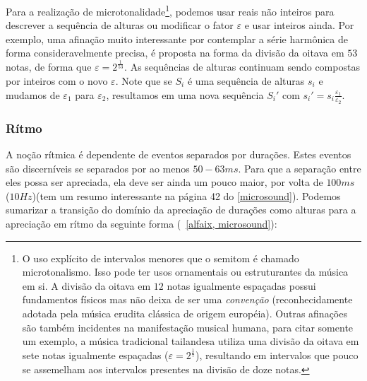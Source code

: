 Para a realização de microtonalidade\footnote{O uso explícito de
intervalos menores que o semitom é chamado microtonalismo. Isso pode ter usos
ornamentais ou estruturantes da música em si. A
divisão da oitava em $12$ notas igualmente espaçadas possui fundamentos físicos mas
não deixa de ser uma \emph{convenção}
(reconhecidamente adotada pela música erudita clássica de origem européia). Outras afinações
são também incidentes na manifestação musical humana, para citar somente um exemplo, a
música tradicional tailandesa utiliza uma divisão da oitava em sete notas igualmente
espaçadas ($\varepsilon=2^{\frac{1}{7}}$),
resultando em intervalos que pouco se assemelham aos intervalos presentes na
divisão de doze notas.}, podemos usar reais não inteiros
para descrever a sequência de alturas ou modificar o fator $\varepsilon$
e usar inteiros ainda. Por exemplo, uma afinação muito
interessante por contemplar a série harmônica de forma consideravelmente precisa,
é proposta na forma da divisão da oitava em $53$ notas, de forma
que $\varepsilon=2^{\frac{1}{53}}$. As sequências de alturas
continuam sendo compostas por inteiros com o novo $\varepsilon$.
Note que se $S_i$ é uma sequência de alturas $s_i$ e mudamos de $\varepsilon_1$ para
$\varepsilon_2$,
resultamos em uma nova sequência $S_i'$ com $s_i'=s_i \frac{\varepsilon_1}{\varepsilon_2}$.

\subsubsection{Rítmo}
A noção rítmica é dependente de eventos separados por durações. Estes eventos são discerníveis se separados
por ao menos $50-63ms$. Para que a separação entre eles possa ser apreciada, ela deve ser ainda um pouco maior,
por volta de $100ms$ ($10Hz$)(tem um resumo interessante na página 42 do \ref{microsound}). Podemos sumarizar 
a transição do domínio da apreciação
de durações como alturas para a apreciação em rítmo da seguinte forma (~\ref{alfaix, microsound}):

